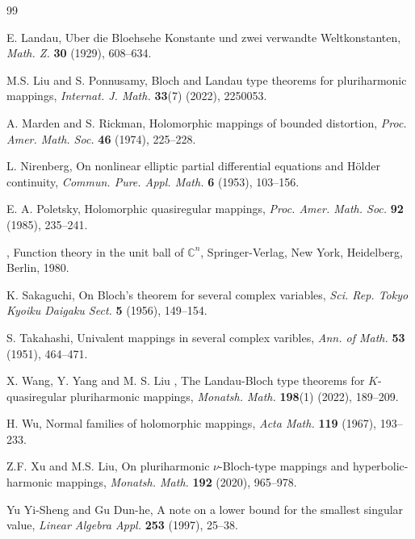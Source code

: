 \documentclass[a4paper,12pt,reqno]{amsart}
\theoremstyle{plain}
\theoremstyle{definition}
\newcommand{\IC}{{\mathbb C}}
\numberwithin{equation}{section}
\begin{document}
\begin{thebibliography}{99}

  {\sc E. Landau},  Uber die Bloehsehe Konstante und zwei verwandte Weltkonstanten, {\it Math. Z.} {\bf 30} (1929), 608--634.

   {\sc M.S. Liu} and {\sc S. Ponnusamy},  Bloch and Landau type theorems for pluriharmonic mappings, {\it  Internat. J. Math.} {\bf 33}(7) (2022), 2250053.
  
   {\sc A. Marden} and {\sc S. Rickman}, Holomorphic mappings of bounded distortion, {\it  Proc. Amer. Math. Soc.} {\bf 46} (1974), 225--228.

     {\sc L. Nirenberg}, On nonlinear elliptic partial differential equations and H\"{o}lder continuity, {\it  Commun. Pure. Appl. Math.} {\bf 6} (1953), 103--156.

    {\sc E. A. Poletsky}, Holomorphic quasiregular mappings, {\it Proc. Amer. Math. Soc.} {\bf 92} (1985), 235--241.

  , Function theory in the unit ball of $\IC^n$, { Springer-Verlag, New York, Heidelberg, Berlin}, 1980.

 {\sc K. Sakaguchi}, On Bloch's theorem for several complex variables, {\it  Sci. Rep. Tokyo Kyoiku Daigaku Sect.} {\bf 5} (1956), 149--154.

 {\sc S. Takahashi}, Univalent mappings in several complex varibles, {\it  Ann. of Math.} {\bf 53} (1951), 464--471.

   {\sc X. Wang}, {\sc Y. Yang} and {\sc M. S. Liu }, The Landau-Bloch type theorems for $K$-quasiregular pluriharmonic mappings, {\it Monatsh. Math.} {\bf 198}(1) (2022), 189--209. 
 
 {\sc H. Wu}, Normal families of holomorphic mappings, {\it  Acta Math.} {\bf 119} (1967), 193--233.

 {\sc Z.F. Xu} and {\sc M.S. Liu}, On pluriharmonic $\nu$-Bloch-type mappings and hyperbolic-harmonic mappings, {\it  Monatsh. Math.} {\bf 192} (2020), 965--978. 

 {\sc Yu Yi-Sheng} and {\sc Gu Dun-he}, A note on a lower bound for the smallest singular value, {\it  Linear Algebra Appl.} {\bf 253} (1997), 25--38.

 
\end{thebibliography}
\end{document}
